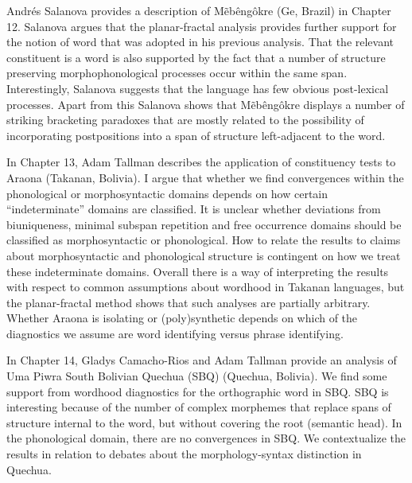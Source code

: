 \documentclass[output=paper,hidelinks]{langscibook}
\begin{document}
Andrés Salanova provides a description of Mẽbêngôkre (Ge, Brazil) in Chapter 12. Salanova argues that the planar-fractal analysis provides further support for the notion of word that was adopted in his previous analysis. That the relevant constituent is a word is also supported by the fact that a number of structure preserving morphophonological processes occur within the same span. Interestingly, Salanova suggests that the language has few obvious post-lexical processes. Apart from this Salanova shows that Mẽbêngôkre displays a number of striking bracketing paradoxes that are mostly related to the possibility of incorporating postpositions into a span of structure left-adjacent to the word. 

In Chapter 13, Adam Tallman describes the application of constituency tests to Araona (Takanan, Bolivia). I argue that whether we find convergences within the phonological or morphosyntactic domains depends on how certain ``indeterminate'' domains are classified. It is unclear whether deviations from biuniqueness, minimal subspan repetition and free occurrence domains should be classified as morphosyntactic or phonological. How to relate the results to claims about morphosyntactic and phonological structure is contingent on how we treat these indeterminate domains. Overall there is a way of interpreting the results with respect to common assumptions about wordhood in Takanan languages, but the planar-fractal method shows that such analyses are partially arbitrary. Whether Araona is isolating or (poly)synthetic depends on which of the diagnostics we assume are word identifying versus phrase identifying.

In Chapter 14, Gladys Camacho-Rios and Adam Tallman provide an analysis of Uma Piwra South Bolivian Quechua (SBQ) (Quechua, Bolivia).  We find some support from wordhood diagnostics for the orthographic word in SBQ. SBQ is interesting because of the number of complex morphemes that replace spans of structure internal to the word, but without covering the root (semantic head). In the phonological domain, there are no convergences in SBQ. We contextualize the results in relation to debates about the morphology-syntax distinction in Quechua.
\end{document}
